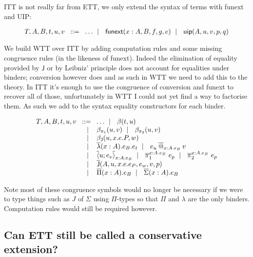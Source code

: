 \acrshort{ITT} is not really far from \acrshort{ETT}, we only extend the syntax
of terms with \acrshort{funext} and \acrshort{UIP}:

\[
  \begin{array}{l@{~\,}r@{~\,}l}
    T,A,B,t,u,v &\bnf& \dots \bnfor \funext{x:A}{B}{f}{g}{e} \bnfor
    \uip{A}{u}{v}{p}{q}
  \end{array}
\]

We build \acrshort{WTT} over \acrshort{ITT} by adding computation rules
and some missing congruence rules (in the likeness of \acrshort{funext}).
Indeed the elimination of equality provided by \(\mathsf{J}\) or by Leibniz'
principle does not account for equalities under binders; conversion however does
and as such in \acrshort{WTT} we need to add this to the theory.
In \acrshort{ITT} it's enough to use the congruence of conversion and
\acrshort{funext} to recover all of those, unfortunately in \acrshort{WTT} I
could not yet find a way to factorise them. As such we add to the syntax
equality constructors for each binder.

\[
  \begin{array}{l@{~\,}r@{~\,}l}
    T,A,B,t,u,v &\bnf& \dots \bnfor \beta(t,u) \\
    &\bnfor& \redpio(u,v) \bnfor \redpit(u,v) \\
    &\bnfor& \redJ(u,x.e.P,w) \\
    &\bnfor& \lamb{x:A}{e_B} e_t
    \bnfor \appb{e_u}{x:A}{e_B}{v} \\
    &\bnfor& \pairb{x:A}{e_B}{u}{e_v}
    \bnfor \piob{x:A}{e_B}{e_p} \bnfor \pitb{x:A}{e_B}{e_p} \\
    &\bnfor& \Jb(A,u,x.e.e_P,e_w,v,p) \\
    &\bnfor& \pib (x:A). e_B \bnfor \sumb (x:A). e_B
  \end{array}
\]

Note most of these congruence symbols would no longer be necessary if we were to
type things such as \(J\) of \(\Sigma\) using \(\Pi\)-types so that \(\Pi\)
and \(\lambda\) are the only binders. Computation rules would still be required
however.

\subsection{Can \acrshort{ETT} still be called a conservative extension?}

